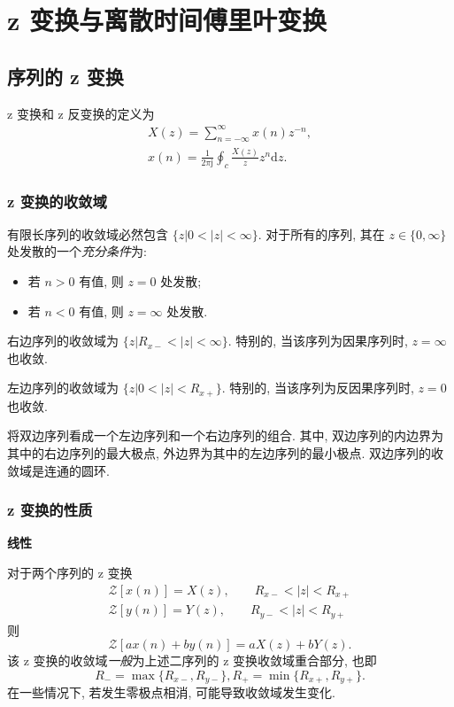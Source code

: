 \section{z 变换与离散时间傅里叶变换}
\subsection{序列的 z 变换}
z 变换和 z 反变换的定义为
\begin{gather}
    X(z)=\sum_{n=-\infty}^{\infty}x(n)z^{-n}, \\
    x(n)=\frac{1}{2\pi\mathrm{j}}\oint_c\frac{X(z)}{z}z^n\mathrm{d}z.
\end{gather}

\subsubsection{z 变换的收敛域}
有限长序列的收敛域必然包含 $\{z|0<|z|<\infty\}$. 对于所有的序列, 其在 $z\in\{0,\infty\}$ 处发散的一个\textit{充分条件}为:
\begin{itemize}
    \item 若 $n>0$ 有值, 则 $z=0$ 处发散;
    \item 若 $n<0$ 有值, 则 $z=\infty$ 处发散.
\end{itemize}

右边序列的收敛域为 $\{z|R_{x-}<|z|<\infty\}$. 特别的, 当该序列为因果序列时, $z=\infty$ 也收敛.

左边序列的收敛域为 $\{z|0<|z|<R_{x+}\}$. 特别的, 当该序列为反因果序列时, $z=0$ 也收敛.

将双边序列看成一个左边序列和一个右边序列的组合. 其中, 双边序列的内边界为其中的右边序列的最大极点, 外边界为其中的左边序列的最小极点. 双边序列的收敛域是连通的圆环.

\subsubsection{z 变换的性质}
\textbf{线性}

对于两个序列的 z 变换
\begin{gather}
    \mathcal{Z}[x(n)]=X(z), \qquad R_{x-}<|z|<R_{x+} \\
    \mathcal{Z}[y(n)]=Y(z), \qquad R_{y-}<|z|<R_{y+}
\end{gather}
则
\begin{equation}
    \mathcal{Z}[ax(n)+by(n)]=aX(z)+bY(z).
\end{equation}
该 z 变换的收敛域\textit{一般}为上述二序列的 z 变换收敛域重合部分, 也即
\begin{equation}
    R_{-}=\max\{R_{x-},R_{y-}\}, R_{+}=\min\{R_{x+},R_{y+}\}.
\end{equation}
在一些情况下, 若发生零极点相消, 可能导致收敛域发生变化.

